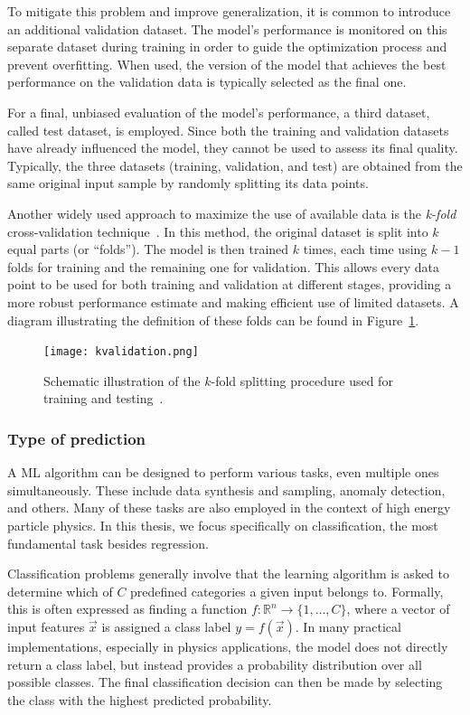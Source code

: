 To mitigate this problem and improve generalization, it is common to introduce an additional validation dataset. The model's performance is monitored on this separate dataset during training in order to guide the optimization process and prevent overfitting. When used, the version of the model that achieves the best performance on the validation data is typically selected as the final one.

For a final, unbiased evaluation of the model’s performance, a third dataset, called test dataset, is employed. Since both the training and validation datasets have already influenced the model, they cannot be used to assess its final quality. Typically, the three datasets (training, validation, and test) are obtained from the same original input sample by randomly splitting its data points.

Another widely used approach to maximize the use of available data is the \textit{k-fold} cross-validation technique~\cite{tmvatoolkit}. In this method, the original dataset is split into $k$ equal parts (or ``folds''). The model is then trained $k$ times, each time using $k-1$ folds for training and the remaining one for validation. This allows every data point to be used for both training and validation at different stages, providing a more robust performance estimate and making efficient use of limited datasets. A diagram illustrating the definition of these folds can be found in Figure~\ref{fig:kfold}.
\begin{figure}[htbp]
    \centering
    \texttt{[image: kvalidation.png]}
    \caption{Schematic illustration of the $k$-fold splitting procedure used for training and testing~\cite{scikit_learn_cv}.}
    \label{fig:kfold}
\end{figure}

\subsubsection*{Type of prediction}
A ML algorithm can be designed to perform various tasks, even multiple ones simultaneously. These include data synthesis and sampling, anomaly detection, and others. Many of these tasks are also employed in the context of high energy particle physics.
In this thesis, we focus specifically on classification, the most fundamental task besides regression.

Classification problems generally involve that the learning algorithm is asked to determine which of $C$ predefined categories a given input belongs to. Formally, this is often expressed as finding a function $f: \mathbb{R}^n \rightarrow \{1, \dots, C\}$, where a vector of input features $\vec{x}$ is assigned a class label $y = f(\vec{x})$. In many practical implementations, especially in physics applications, the model does not directly return a class label, but instead provides a probability distribution over all possible classes. The final classification decision can then be made by selecting the class with the highest predicted probability.

